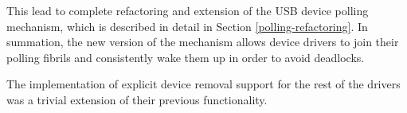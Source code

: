 This lead to complete refactoring and extension of the USB device polling
mechanism, which is described in detail in Section \ref{polling-refactoring}.
In summation, the new version of the mechanism allows device drivers to join
their polling fibrils and consistently wake them up in order to avoid deadlocks.

The implementation of explicit device removal support for the rest of the
drivers was a trivial extension of their previous functionality.


